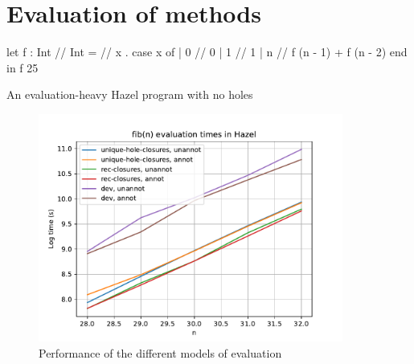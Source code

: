 \section{Evaluation of methods}
\label{sec:evaluation}

\begin{listing}
\begin{hminted}
let f : Int /\rar/ Int =
  /\lbd/ x . {
    case x of
    | 0 /\Rar/ 0
    | 1 /\Rar/ 1
    | n /\Rar/ f (n - 1) + f (n - 2)
    end
  }
in f 25  
\end{hminted}
\caption{An evaluation-heavy Hazel program with no holes}
\end{listing}

\begin{figure}
  \centering
  \includegraphics[width=10cm]{img/subst_evalenv_fib_perf.pdf}
  \caption{Performance of the different models of evaluation}
  \label{fig:perf_evaluation_models}
\end{figure}





